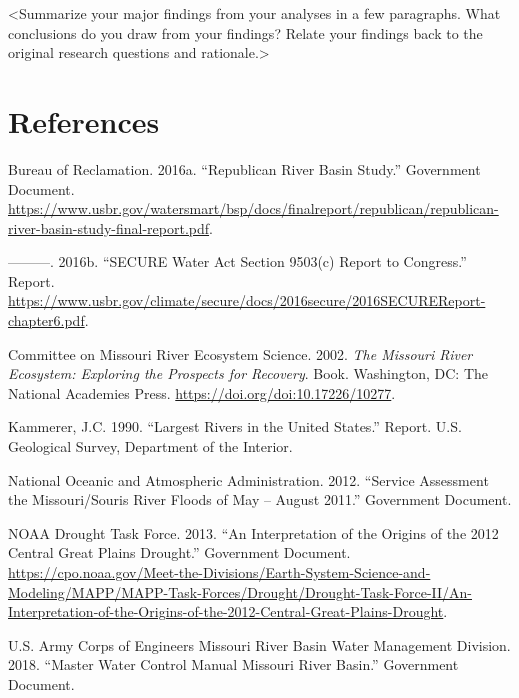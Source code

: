 \documentclass[12pt,]{article}
\begin{document}
\textless{}Summarize your major findings from your analyses in a few
paragraphs. What conclusions do you draw from your findings? Relate your
findings back to the original research questions and
rationale.\textgreater{}

\newpage

\hypertarget{references}{%
\section*{References}\label{references}}

\hypertarget{refs}{}
\leavevmode\hypertarget{ref-bor2016-2}{}%
Bureau of Reclamation. 2016a. ``Republican River Basin Study.''
Government Document.
\url{https://www.usbr.gov/watersmart/bsp/docs/finalreport/republican/republican-river-basin-study-final-report.pdf}.

\leavevmode\hypertarget{ref-bor2016-1}{}%
---------. 2016b. ``SECURE Water Act Section 9503(c) Report to
Congress.'' Report.
\url{https://www.usbr.gov/climate/secure/docs/2016secure/2016SECUREReport-chapter6.pdf}.

\leavevmode\hypertarget{ref-nrc2002}{}%
Committee on Missouri River Ecosystem Science. 2002. \emph{The Missouri
River Ecosystem: Exploring the Prospects for Recovery}. Book.
Washington, DC: The National Academies Press.
\url{https://doi.org/doi:10.17226/10277}.

\leavevmode\hypertarget{ref-kammerer1990}{}%
Kammerer, J.C. 1990. ``Largest Rivers in the United States.'' Report.
U.S. Geological Survey, Department of the Interior.

\leavevmode\hypertarget{ref-noaa2012}{}%
National Oceanic and Atmospheric Administration. 2012. ``Service
Assessment the Missouri/Souris River Floods of May -- August 2011.''
Government Document.

\leavevmode\hypertarget{ref-noaa2013}{}%
NOAA Drought Task Force. 2013. ``An Interpretation of the Origins of the
2012 Central Great Plains Drought.'' Government Document.
\url{https://cpo.noaa.gov/Meet-the-Divisions/Earth-System-Science-and-Modeling/MAPP/MAPP-Task-Forces/Drought/Drought-Task-Force-II/An-Interpretation-of-the-Origins-of-the-2012-Central-Great-Plains-Drought}.

\leavevmode\hypertarget{ref-usace2018}{}%
U.S. Army Corps of Engineers Missouri River Basin Water Management
Division. 2018. ``Master Water Control Manual Missouri River Basin.''
Government Document.
\end{document}
